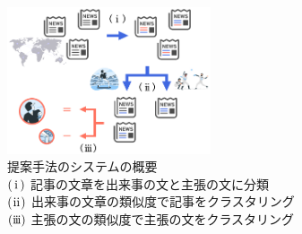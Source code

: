 \documentclass[a4paper, twocolumn, 10pt]{jarticle}
\makeatletter
\def\section{%
	\@startsection{section}{1}{\z@}%
	{.1\Cvs \@plus.1\Cdp \@minus.1\Cdp}%
	{.1\Cvs \@plus.1\Cdp}%
	{\normalfont\normalsize\bfseries}%
}
\makeatother
\begin{document}
\begin{figure}[H]
	\centering
	\includegraphics[keepaspectratio, width=60mm]{img/system_abstract.png}
	\caption{
    提案手法のシステムの概要
    \\$\rm(\hspace{.18em}i\hspace{.18em})$
    記事の文章を出来事の文と主張の文に分類
    \\$\rm(\hspace{.08em}ii\hspace{.08em})$
    出来事の文章の類似度で記事をクラスタリング
    \\$\rm(i\hspace{-.08em}i\hspace{-.08em}i)$
    主張の文の類似度で主張の文をクラスタリング
  }
	\label{system_abstract}
\end{figure}



\end{document}
